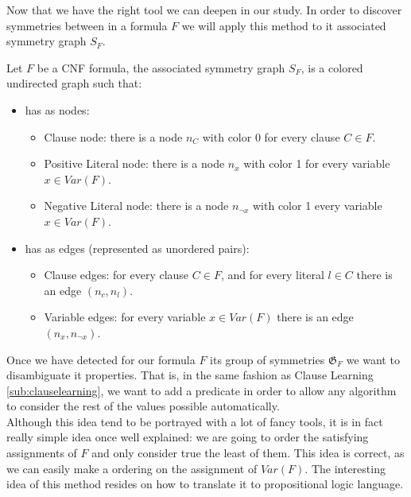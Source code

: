 Now that we have the right tool we can deepen in our study. In order to discover symmetries between in a formula $F$  we will apply this method to it associated symmetry graph $S_F$.

\begin{definition}
  Let $F$ be a CNF formula, the associated symmetry graph $S_F$, is a colored undirected graph such that:
  \begin{itemize}
  \item has as nodes:
    \begin{itemize}
    \item Clause node: there is a node $n_C$ with color 0 for every clause $C \in F$.
    \item Positive Literal node: there is a node $n_x$ with color 1 for every variable $x\in Var(F)$.
    \item Negative Literal node: there is a node $n_{\neg x}$ with color 1 every variable $x\in Var(F)$.
    \end{itemize}
  \item has as edges (represented as unordered pairs):
    \begin{itemize}
    \item Clause edges: for every clause $C\in F$, and for every literal $l\in C$ there is an edge $(n_c, n_l)$.
    \item Variable edges: for every variable $x\in Var(F)$ there is an edge $(n_x,n_{\neg x})$.
    \end{itemize}
  \end{itemize}
\end{definition}





Once we have detected for our formula $F$  its group of symmetries $\mathfrak{G}_F$ we want to disambiguate it properties. That is, in the same fashion as Clause Learning \ref{sub:clauselearning}, we want to add a predicate in order to allow any algorithm to consider the rest of the values possible automatically.\\

Although this idea tend to be portrayed with a lot of fancy tools, it is in fact really simple idea once well explained: we are going to order the satisfying assignments of $F$ and only consider true the least of them. This idea is correct, as we can easily make a ordering on the assignment of $Var(F)$. The interesting idea of this method resides on how to translate it to propositional logic language.\\

